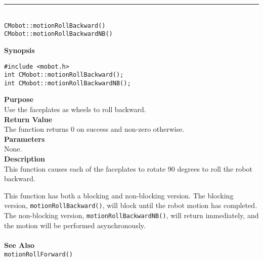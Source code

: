 \noindent
\vspace{5pt}
\rule{4.5in}{0.015in}\\
\noindent
{\LARGE \texttt{CMobot::motionRollBackward()}}\\
{\LARGE \texttt{CMobot::motionRollBackwardNB()}}\\
{}

\noindent
{\bf Synopsis}\\
\begin{verbatim}
#include <mobot.h>
int CMobot::motionRollBackward();
int CMobot::motionRollBackwardNB();
\end{verbatim}

\noindent
{\bf Purpose}\\
Use the faceplates as wheels to roll backward.\\

\noindent
{\bf Return Value}\\
The function returns 0 on success and non-zero otherwise.\\

\noindent
{\bf Parameters}\\
None.\\

\noindent
{\bf Description}\\
This function causes each of the faceplates to rotate 90 degrees to roll the
robot backward.

This function has both a blocking and non-blocking version.
The blocking version, \texttt{motionRollBackward()}, will block until the
robot motion has completed. The non-blocking version, \texttt{motionRollBackwardNB()},
will return immediately, and the motion will be performed asynchronously.\\
\\

\noindent
{\bf See Also}\\
\texttt{motionRollForward()}


